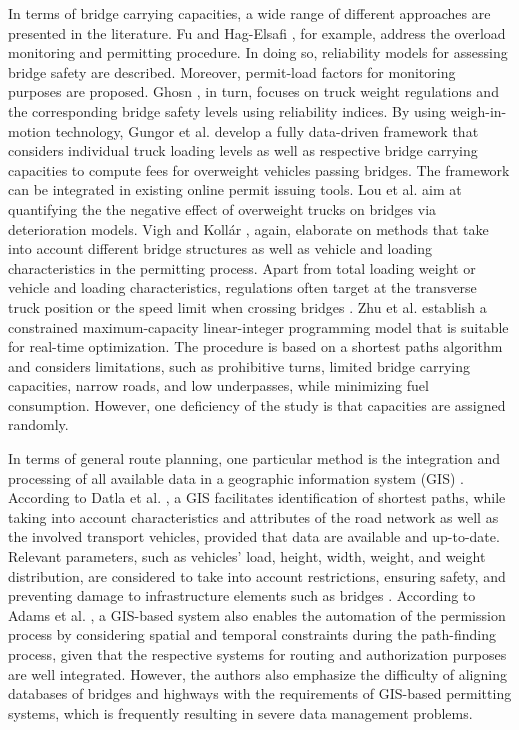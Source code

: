 \par
In terms of bridge carrying capacities, a wide range of different approaches are presented in the literature. Fu and Hag-Elsafi \cite{fu2000vehicular}, for example, address the overload monitoring and permitting procedure. In doing so, reliability models for assessing bridge safety are described. Moreover, permit-load factors for monitoring purposes are proposed. Ghosn \cite{ghosn2000development}, in turn, focuses on truck weight regulations and the corresponding bridge safety levels using reliability indices. By using weigh-in-motion technology, Gungor et al. \cite{gungor2018detect} develop a fully data-driven framework that considers individual truck loading levels as well as respective bridge carrying capacities to compute fees for overweight vehicles passing bridges. The framework can be integrated in existing online permit issuing tools. Lou et al. \cite{lou2016effect} aim at quantifying the the negative effect of overweight trucks on bridges via deterioration models. Vigh and Kollár \cite{vigh2006approximate, vigh2007routing}, again, elaborate on methods that take into account different bridge structures as well as vehicle and loading characteristics in the permitting process. Apart from total loading weight or vehicle and loading characteristics, regulations often target at the transverse truck position or the speed limit when crossing bridges \cite{yan2018optimal}. Zhu et al. \cite{zhu2014vehicle} establish a constrained maximum-capacity linear-integer programming model that is suitable for real-time optimization. The procedure is based on a shortest paths algorithm and considers limitations, such as prohibitive turns, limited bridge carrying capacities, narrow roads, and low underpasses, while minimizing fuel consumption. However, one deficiency of the study is that capacities are assigned randomly.
\par
In terms of general route planning, one particular method is the integration and processing of all available data in a geographic information system (GIS) \cite{durham2002gis}.
According to Datla et al. \cite{datla2004gis}, a GIS facilitates identification of shortest paths, while taking into account characteristics and attributes of the road network as well as the involved transport vehicles, provided that data are available and up-to-date. Relevant parameters, such as vehicles' load, height, width, weight, and weight distribution, are considered to take into account restrictions, ensuring safety, and preventing damage to infrastructure elements such as bridges \cite{ecmt2006improving, vaitkus2016effect, kombe2017modelling, pauer2017development}. According to Adams et al. \cite{adams2002enterprise}, a GIS-based system also enables the automation of the permission process by considering spatial and temporal constraints during the path-finding process, given that the respective systems for routing and authorization purposes are well integrated. However, the authors also emphasize the difficulty of aligning databases of bridges and highways with the requirements of GIS-based permitting systems, which is frequently resulting in severe data management problems.
